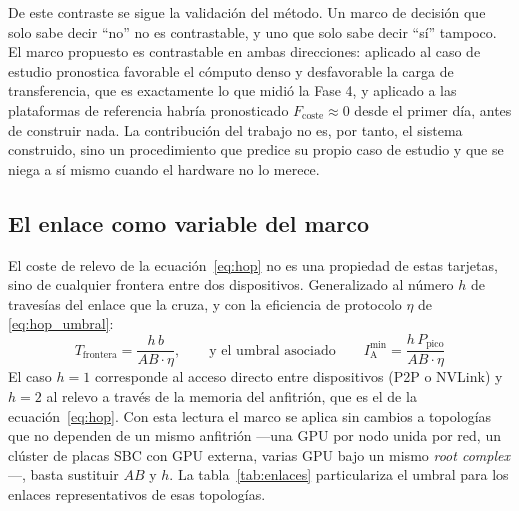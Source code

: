 \documentclass[a4paper,11pt]{article}
\begin{document}
De este contraste se sigue la validación del método. Un marco de decisión que solo sabe decir ``no'' no es contrastable, y uno que
solo sabe decir ``sí'' tampoco. El marco propuesto es contrastable en ambas direcciones: aplicado al caso de estudio pronostica
favorable el cómputo denso y desfavorable la carga de transferencia, que es exactamente lo que midió la Fase 4, y aplicado a las
plataformas de referencia habría pronosticado $F_{\text{coste}} \approx 0$ desde el primer día, antes de construir nada. La
contribución del trabajo no es, por tanto, el sistema construido, sino un procedimiento que predice su propio caso de estudio y
que se niega a sí mismo cuando el hardware no lo merece.

\subsection*{El enlace como variable del marco}

El coste de relevo de la ecuación~\eqref{eq:hop} no es una propiedad de estas tarjetas, sino de cualquier frontera entre dos
dispositivos. Generalizado al número $h$ de travesías del enlace que la cruza, y con la eficiencia de protocolo $\eta$ de
\eqref{eq:hop_umbral}:
\begin{equation}\label{eq:frontera}
    T_{\text{frontera}} = \frac{h\,b}{AB \cdot \eta},
    \qquad\text{y el umbral asociado}\qquad
    I_{\text{A}}^{\text{min}} = \frac{h\,P_{\text{pico}}}{AB \cdot \eta}
\end{equation}
El caso $h=1$ corresponde al acceso directo entre dispositivos (P2P o NVLink) y $h=2$ al relevo a través de la memoria del
anfitrión, que es el de la ecuación~\eqref{eq:hop}. Con esta lectura el marco se aplica sin cambios a topologías que no dependen
de un mismo anfitrión ---una GPU por nodo unida por red, un clúster de placas SBC con GPU externa, varias GPU bajo un mismo
\textit{root complex}---, basta sustituir $AB$ y $h$. La tabla~\ref{tab:enlaces} particulariza el umbral para los enlaces
representativos de esas topologías.
\end{document}
